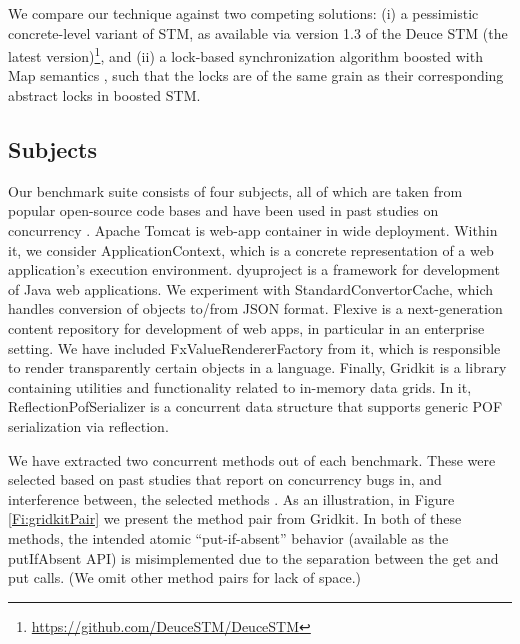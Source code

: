 We compare our technique against two competing solutions: (i) a pessimistic concrete-level variant of STM, as available via version 1.3 of the Deuce STM (the latest version)\footnote{
		\url{https://github.com/DeuceSTM/DeuceSTM}
	}, and (ii)  a lock-based synchronization algorithm boosted with {\sf Map} semantics \cite{ppopp/HerlihyK08}, such that the locks are of the same grain as their corresponding abstract locks in boosted STM.

\subsection{Subjects}

Our benchmark suite consists of four subjects, all of which are taken from popular open-source code bases and have been used in past studies on concurrency \cite{oopsla/ShachamBASVY11,issta/ShachamYGABSV14}.
	Apache Tomcat is web-app container in wide deployment. Within it, we consider {\sf ApplicationContext}, which is a concrete representation of a web application's execution environment.
	dyuproject is a framework for development of Java web applications. We experiment with {\sf StandardConvertorCache}, which handles conversion of objects to/from JSON format.
	Flexive is a next-generation content repository for development of web apps, in particular in an enterprise setting. We have included {\sf FxValueRendererFactory} from it, which is responsible to render transparently certain objects in a language.
	Finally, Gridkit is a library containing utilities and functionality related to in-memory data grids. In it, {\sf ReflectionPofSerializer} is a concurrent data structure that supports generic POF serialization via reflection.

We have extracted two concurrent methods out of each benchmark. These were selected based on past studies that report on concurrency bugs in, and interference between, the selected methods \cite{oopsla/ShachamBASVY11}. 
%
As an illustration, in Figure \ref{Fi:gridkitPair} we present the method pair from Gridkit. In both of these methods, the intended atomic ``put-if-absent'' behavior (available as the {\sf putIfAbsent} API) is misimplemented due to the separation between the {\sf get} and {\sf put} calls. (We omit other method pairs for lack of space.)

